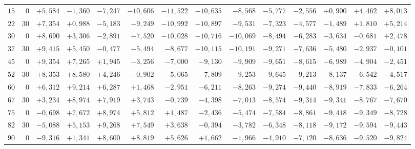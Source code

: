 \begin{landscape}
\begin{longtable}{@{}rr|r|r|r|r|r|r|r|r|r|r|r|r@{}}
\(15\) & \(0\) & \(+5{,}584\) & \(-1{,}360\) & \(-7{,}247\) & \(-10{,}606\) & \(-11{,}522\) & \(-10{,}635\) & \(-8{,}568\) & \(-5{,}777\) & \(-2{,}556\) & \(+0{,}900\) & \(+4{,}462\) & \(+8{,}013\)\\
\(22\) & \(30\) & \(+7{,}354\) & \(+0{,}988\) & \(-5{,}183\) & \(-9{,}249\) & \(-10{,}992\) & \(-10{,}897\) & \(-9{,}531\) & \(-7{,}323\) & \(-4{,}577\) & \(-1{,}489\) & \(+1{,}810\) & \(+5{,}214\)\\[2pt]
\(30\) & \(0\) & \(+8{,}690\) & \(+3{,}306\) & \(-2{,}891\) & \(-7{,}520\) & \(-10{,}028\) & \(-10{,}716\) & \(-10{,}069\) & \(-8{,}494\) & \(-6{,}283\) & \(-3{,}634\) & \(-0{,}681\) & \(+2{,}478\)\\
\(37\) & \(30\) & \(+9{,}415\) & \(+5{,}450\) & \(-0{,}477\) & \(-5{,}494\) & \(-8{,}677\) & \(-10{,}115\) & \(-10{,}191\) & \(-9{,}271\) & \(-7{,}636\) & \(-5{,}480\) & \(-2{,}937\) & \(-0{,}101\)\\
\(45\) & \(0\) & \(+9{,}354\) & \(+7{,}265\) & \(+1{,}945\) & \(-3{,}256\) & \(-7{,}000\) & \(-9{,}130\) & \(-9{,}909\) & \(-9{,}651\) & \(-8{,}615\) & \(-6{,}989\) & \(-4{,}904\) & \(-2{,}451\)\\
\(52\) & \(30\) & \(+8{,}353\) & \(+8{,}580\) & \(+4{,}246\) & \(-0{,}902\) & \(-5{,}065\) & \(-7{,}809\) & \(-9{,}253\) & \(-9{,}645\) & \(-9{,}213\) & \(-8{,}137\) & \(-6{,}542\) & \(-4{,}517\)\\[2pt]
\(60\) & \(0\) & \(+6{,}312\) & \(+9{,}214\) & \(+6{,}287\) & \(+1{,}468\) & \(-2{,}951\) & \(-6{,}211\) & \(-8{,}263\) & \(-9{,}274\) & \(-9{,}440\) & \(-8{,}919\) & \(-7{,}833\) & \(-6{,}264\)\\
\(67\) & \(30\) & \(+3{,}234\) & \(+8{,}974\) & \(+7{,}919\) & \(+3{,}743\) & \(-0{,}739\) & \(-4{,}398\) & \(-7{,}013\) & \(-8{,}574\) & \(-9{,}314\) & \(-9{,}341\) & \(-8{,}767\) & \(-7{,}670\)\\
\(75\) & \(0\) & \(-0{,}698\) & \(+7{,}672\) & \(+8{,}974\) & \(+5{,}812\) & \(+1{,}487\) & \(-2{,}436\) & \(-5{,}474\) & \(-7{,}584\) & \(-8{,}861\) & \(-9{,}418\) & \(-9{,}349\) & \(-8{,}728\)\\
\(82\) & \(30\) & \(-5{,}088\) & \(+5{,}153\) & \(+9{,}268\) & \(+7{,}549\) & \(+3{,}638\) & \(-0{,}394\) & \(-3{,}782\) & \(-6{,}348\) & \(-8{,}118\) & \(-9{,}172\) & \(-9{,}594\) & \(-9{,}443\)\\[2pt]
\(90\) & \(0\) & \(-9{,}316\) & \(+1{,}341\) & \(+8{,}600\) & \(+8{,}819\) & \(+5{,}626\) & \(+1{,}662\) & \(-1{,}966\) & \(-4{,}910\) & \(-7{,}120\) & \(-8{,}636\) & \(-9{,}520\) & \(-9{,}824\)\\

\end{longtable}
\end{landscape}
